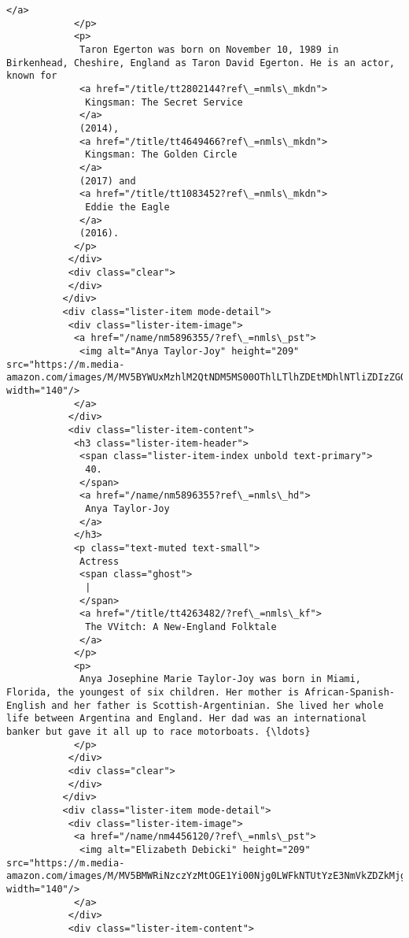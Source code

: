 \documentclass[11pt]{article}
\begin{document}
\begin{Verbatim}[commandchars=\\\{\}]
             </a>
            </p>
            <p>
             Taron Egerton was born on November 10, 1989 in Birkenhead, Cheshire, England as Taron David Egerton. He is an actor, known for
             <a href="/title/tt2802144?ref\_=nmls\_mkdn">
              Kingsman: The Secret Service
             </a>
             (2014),
             <a href="/title/tt4649466?ref\_=nmls\_mkdn">
              Kingsman: The Golden Circle
             </a>
             (2017) and
             <a href="/title/tt1083452?ref\_=nmls\_mkdn">
              Eddie the Eagle
             </a>
             (2016).
            </p>
           </div>
           <div class="clear">
           </div>
          </div>
          <div class="lister-item mode-detail">
           <div class="lister-item-image">
            <a href="/name/nm5896355/?ref\_=nmls\_pst">
             <img alt="Anya Taylor-Joy" height="209" src="https://m.media-amazon.com/images/M/MV5BYWUxMzhlM2QtNDM5MS00OThlLTlhZDEtMDhlNTliZDIzZGQ1XkEyXkFqcGdeQXVyNzcyNzc0NzE@.\_V1\_UY209\_CR13,0,140,209\_AL\_.jpg" width="140"/>
            </a>
           </div>
           <div class="lister-item-content">
            <h3 class="lister-item-header">
             <span class="lister-item-index unbold text-primary">
              40.
             </span>
             <a href="/name/nm5896355?ref\_=nmls\_hd">
              Anya Taylor-Joy
             </a>
            </h3>
            <p class="text-muted text-small">
             Actress
             <span class="ghost">
              |
             </span>
             <a href="/title/tt4263482/?ref\_=nmls\_kf">
              The VVitch: A New-England Folktale
             </a>
            </p>
            <p>
             Anya Josephine Marie Taylor-Joy was born in Miami, Florida, the youngest of six children. Her mother is African-Spanish-English and her father is Scottish-Argentinian. She lived her whole life between Argentina and England. Her dad was an international banker but gave it all up to race motorboats. {\ldots}
            </p>
           </div>
           <div class="clear">
           </div>
          </div>
          <div class="lister-item mode-detail">
           <div class="lister-item-image">
            <a href="/name/nm4456120/?ref\_=nmls\_pst">
             <img alt="Elizabeth Debicki" height="209" src="https://m.media-amazon.com/images/M/MV5BMWRiNzczYzMtOGE1Yi00Njg0LWFkNTUtYzE3NmVkZDZkMjg5XkEyXkFqcGdeQXVyMjQwMDg0Ng@@.\_V1\_UY209\_CR14,0,140,209\_AL\_.jpg" width="140"/>
            </a>
           </div>
           <div class="lister-item-content">

\end{Verbatim}
\end{document}
